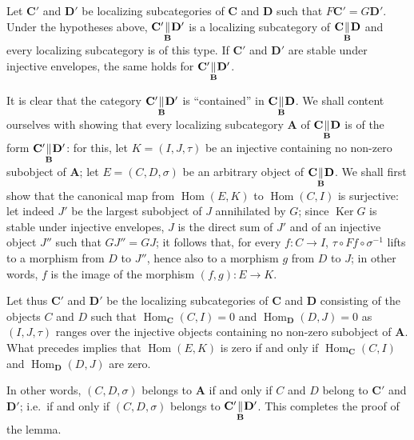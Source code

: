 \begin{lemma}
Let $\mathbf{C}'$ and $\mathbf{D}'$ be localizing subcategories of
$\mathbf{C}$ and $\mathbf{D}$ such that
$F\mathbf{C}' = G\mathbf{D}'$. Under the hypotheses above,
$\mathbf{C}' \underset{\mathbf{B}}{\Vert} \mathbf{D}'$ is a localizing
subcategory of $\mathbf{C} \underset{\mathbf{B}}{\Vert} \mathbf{D}$ and every
localizing subcategory is of this type. If $\mathbf{C}'$ and
$\mathbf{D}'$ are stable under injective envelopes, the same holds for
$\mathbf{C}' \underset{\mathbf{B}}{\Vert} \mathbf{D}'$.
\end{lemma}

It is clear that the category
$\mathbf{C}' \underset{\mathbf{B}}{\Vert} \mathbf{D}'$ is ``contained'' in
$\mathbf{C} \underset{\mathbf{B}}{\Vert} \mathbf{D}$. We shall content
ourselves with showing that every localizing subcategory $\mathbf{A}$ of
$\mathbf{C} \underset{\mathbf{B}}{\Vert} \mathbf{D}$ is of the form
$\mathbf{C}' \underset{\mathbf{B}}{\Vert} \mathbf{D}'$: for this, let
$K = (I, J, \tau)$ be an injective containing no non-zero subobject of
$\mathbf{A}$; let $E = (C, D, \sigma)$ be an arbitrary object of
$\mathbf{C} \underset{\mathbf{B}}{\Vert} \mathbf{D}$. We shall first show that
the canonical map from $\operatorname{Hom}(E, K)$ to
$\operatorname{Hom}(C, I)$ is surjective: let indeed $J'$ be the largest
subobject of $J$ annihilated by $G$; since $\operatorname{Ker} G$ is
stable under injective envelopes, $J$ is the direct sum of $J'$ and of
an injective object $J''$ such that $GJ'' = GJ$; it follows that, for
every $f : C \to I$, $\tau \circ Ff \circ \sigma^{-1}$ lifts to a
morphism from $D$ to $J''$, hence also to a morphism $g$ from $D$ to
$J$; in other words, $f$ is the image of the morphism
$(f, g) : E \to K$.

Let thus $\mathbf{C}'$ and $\mathbf{D}'$ be the localizing
subcategories of $\mathbf{C}$ and $\mathbf{D}$ consisting of the objects
$C$ and $D$ such that
$\operatorname{Hom}_{\mathbf{C}}(C, I) = 0$ and
$\operatorname{Hom}_{\mathbf{D}}(D, J) = 0$ as $(I, J, \tau)$ ranges over
the injective objects containing no non-zero subobject of
$\mathbf{A}$. What precedes implies that $\operatorname{Hom}(E, K)$ is
zero if and only if $\operatorname{Hom}_{\mathbf{C}}(C, I)$ and
$\operatorname{Hom}_{\mathbf{D}}(D, J)$ are zero.

In other words, $(C, D, \sigma)$ belongs to $\mathbf{A}$ if and only if
$C$ and $D$ belong to $\mathbf{C}'$ and $\mathbf{D}'$; i.e.\ if and only
if $(C, D, \sigma)$ belongs to
$\mathbf{C}' \underset{\mathbf{B}}{\Vert} \mathbf{D}'$. This completes the
proof of the lemma.

